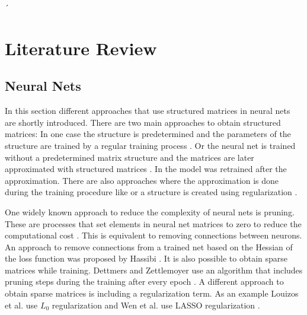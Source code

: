 \documentclass[doctype=mastersthesis,BCOR=15mm,biblatex]{ldvbook}%
\begin{document}
´

\chapter{Literature Review}

\section{Neural Nets}
In this section different approaches that use structured matrices in neural nets are shortly introduced.
There are two main approaches to obtain structured matrices:
In one case the structure is predetermined and the parameters of the structure are trained by a regular training process \cite{fan_multiscale_2019,dao_kaleidoscope_2020,li_butterfly_2015,ailon_sparse_2021,ioannou_training_2016}.
Or the neural net is trained without a predetermined matrix structure and the matrices are later approximated with structured matrices \cite{wu_hybrid_2020,hassibi_optimal_1993,jaderberg_speeding_2014,rigamonti_learning_2013}. In \cite{yu_compressing_2017} the model was retrained after the approximation. 
There are also approaches where the approximation is done during the training procedure like \cite{dettmers_sparse_2019} or a structure is created using regularization \cite{louizos_learning_2018,wen_learning_2016}.


One widely known approach to reduce the complexity of neural nets is pruning. 
These are processes that set elements in neural net matrices to zero to reduce the computational cost \cite{blalock_what_2020}.
This is equivalent to removing connections between neurons.
An approach to remove connections from a trained net based on the Hessian of the loss function was proposed by Hassibi \cite{hassibi_optimal_1993}.
It is also possible to obtain sparse matrices while training.
Dettmers and Zettlemoyer use an algorithm that includes pruning steps during the training after every epoch \cite{dettmers_sparse_2019}.
A different approach to obtain sparse matrices is including a regularization term.
As an example Louizos et al. use $L_0$ regularization  \cite{louizos_learning_2018} and Wen et al. use LASSO regularization \cite{wen_learning_2016}.
\end{document}
